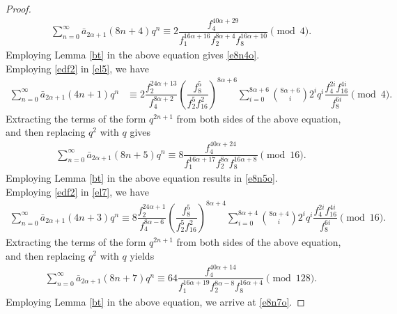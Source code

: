 \documentclass[10pt,a4paper]{amsart}
\begin{document}
\begin{proof}
			\begin{align*}
			\sum_{n=0}^{\infty}\bar{a}_{2\alpha+1}(8n+4)q^n\equiv 2\dfrac{f_4^{40\alpha+29}}{f_1^{16\alpha+16}f_2^{8\alpha+4}f_8^{16\alpha+10}}\pmod 4.
			\end{align*}
			Employing Lemma \ref{bt} in the above equation gives \eqref{e8n4o}.\\
		\indent	Employing \eqref{edf2} in \eqref{el5}, we have
			\begin{align*}
			\sum_{n=0}^{\infty}\bar{a}_{2\alpha+1}(4n+1)q^n&\equiv 2\dfrac{f_2^{24\alpha+13}}{f_4^{8\alpha+2}}\left(\dfrac{f_8^5}{f_2^5f_{16}^2}\right)^{8\alpha+6}\sum_{i=0}^{8\alpha+6}\binom{8\alpha+6}{i}2^iq^i\dfrac{f_4^{2i}f_{16}^{4i}}{f_8^{6i}}\pmod 4.
			\end{align*}
			Extracting the terms of the form $q^{2n+1}$ from both sides of the above equation, and then replacing $q^{2}$ with $q$ gives
			\begin{align*}
			\sum_{n=0}^{\infty}\bar{a}_{2\alpha+1}(8n+5)q^n\equiv 8 \dfrac{f_4^{40\alpha+24}}{f_1^{16\alpha+17}f_2^{8\alpha}f_8^{16\alpha+8}}\pmod{16}.
			\end{align*}
			Employing Lemma \ref{bt} in the above equation results in \eqref{e8n5o}.\\
			\indent Employing \eqref{edf2} in \eqref{el7}, we have
			\begin{align*}
			\sum_{n=0}^{\infty}\bar{a}_{2\alpha+1}(4n+3)q^n\equiv 8\dfrac{f_2^{24\alpha+1}}{f_4^{8\alpha-6}}\left(\dfrac{f_8^5}{f_2^5f_{16}^2}\right)^{8\alpha+4}\sum_{i=0}^{8\alpha+4}\binom{8\alpha+4}{i}2^iq^i\dfrac{f_4^{2i}f_{16}^{4i}}{f_8^{6i}}\pmod{16}.
			\end{align*}
			Extracting the terms of the form $q^{2n+1}$ from both sides of the above equation, and then replacing $q^{2}$ with $q$ yields
			\begin{align*}
			\sum_{n=0}^{\infty}\bar{a}_{2\alpha+1}(8n+7)q^n\equiv 64\dfrac{f_4^{40\alpha+14}}{f_1^{16\alpha+19}f_2^{8\alpha-8}f_8^{16\alpha+4}}\pmod{128}.
			\end{align*}
			Employing Lemma \ref{bt} in the above equation, we arrive at \eqref{e8n7o}.
	\end{proof}
\end{document}
